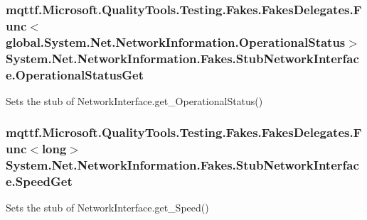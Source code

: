 \hypertarget{class_system_1_1_net_1_1_network_information_1_1_fakes_1_1_stub_network_interface_a26ffc186445cb755c6359bb35aed55ac}{
\subsubsection[{Operational\-Status\-Get}]{\setlength{\rightskip}{0pt plus 5cm}mqttf.\-Microsoft.\-Quality\-Tools.\-Testing.\-Fakes.\-Fakes\-Delegates.\-Func$<$global.\-System.\-Net.\-Network\-Information.\-Operational\-Status$>$ System.\-Net.\-Network\-Information.\-Fakes.\-Stub\-Network\-Interface.\-Operational\-Status\-Get}}\label{class_system_1_1_net_1_1_network_information_1_1_fakes_1_1_stub_network_interface_a26ffc186445cb755c6359bb35aed55ac}


Sets the stub of Network\-Interface.\-get\-\_\-\-Operational\-Status()

\hypertarget{class_system_1_1_net_1_1_network_information_1_1_fakes_1_1_stub_network_interface_a3a12a79bf9d92761ddf2d7e34ced8976}{
\subsubsection[{Speed\-Get}]{\setlength{\rightskip}{0pt plus 5cm}mqttf.\-Microsoft.\-Quality\-Tools.\-Testing.\-Fakes.\-Fakes\-Delegates.\-Func$<$long$>$ System.\-Net.\-Network\-Information.\-Fakes.\-Stub\-Network\-Interface.\-Speed\-Get}}\label{class_system_1_1_net_1_1_network_information_1_1_fakes_1_1_stub_network_interface_a3a12a79bf9d92761ddf2d7e34ced8976}


Sets the stub of Network\-Interface.\-get\-\_\-\-Speed()

